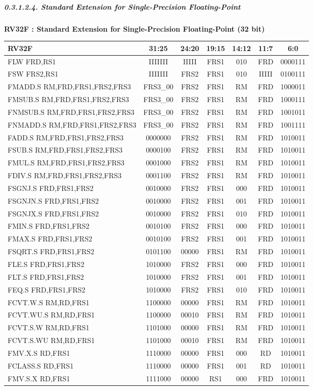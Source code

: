 \documentclass[
]{article}
\begin{document}
\hypertarget{standard-extension-for-single-precision-floating-point}{%
\subparagraph{0.3.1.2.4. Standard Extension for Single-Precision
Floating-Point}\label{standard-extension-for-single-precision-floating-point}}

\textbf{RV32F : Standard Extension for Single-Precision Floating-Point
(32 bit)}

\begin{longtable}[]{@{}lcccccc@{}}
\toprule
RV32F & 31:25 & 24:20 & 19:15 & 14:12 & 11:7 & 6:0\tabularnewline
\midrule
\endhead
FLW FRD,RS1 & IIIIIII & IIIII & FRS1 & 010 & FRD &
0000111\tabularnewline
FSW FRS2,RS1 & IIIIIII & FRS2 & FRS1 & 010 & IIIII &
0100111\tabularnewline
FMADD.S RM,FRD,FRS1,FRS2,FRS3 & FRS3\_00 & FRS2 & FRS1 & RM & FRD &
1000011\tabularnewline
FMSUB.S RM,FRD,FRS1,FRS2,FRS3 & FRS3\_00 & FRS2 & FRS1 & RM & FRD &
1000111\tabularnewline
FNMSUB.S RM,FRD,FRS1,FRS2,FRS3 & FRS3\_00 & FRS2 & FRS1 & RM & FRD &
1001011\tabularnewline
FNMADD.S RM,FRD,FRS1,FRS2,FRS3 & FRS3\_00 & FRS2 & FRS1 & RM & FRD &
1001111\tabularnewline
FADD.S RM,FRD,FRS1,FRS2,FRS3 & 0000000 & FRS2 & FRS1 & RM & FRD &
1010011\tabularnewline
FSUB.S RM,FRD,FRS1,FRS2,FRS3 & 0000100 & FRS2 & FRS1 & RM & FRD &
1010011\tabularnewline
FMUL.S RM,FRD,FRS1,FRS2,FRS3 & 0001000 & FRS2 & FRS1 & RM & FRD &
1010011\tabularnewline
FDIV.S RM,FRD,FRS1,FRS2,FRS3 & 0001100 & FRS2 & FRS1 & RM & FRD &
1010011\tabularnewline
FSGNJ.S FRD,FRS1,FRS2 & 0010000 & FRS2 & FRS1 & 000 & FRD &
1010011\tabularnewline
FSGNJN.S FRD,FRS1,FRS2 & 0010000 & FRS2 & FRS1 & 001 & FRD &
1010011\tabularnewline
FSGNJX.S FRD,FRS1,FRS2 & 0010000 & FRS2 & FRS1 & 010 & FRD &
1010011\tabularnewline
FMIN.S FRD,FRS1,FRS2 & 0010100 & FRS2 & FRS1 & 000 & FRD &
1010011\tabularnewline
FMAX.S FRD,FRS1,FRS2 & 0010100 & FRS2 & FRS1 & 001 & FRD &
1010011\tabularnewline
FSQRT.S FRD,FRS1,FRS2 & 0101100 & 00000 & FRS1 & RM & FRD &
1010011\tabularnewline
FLE.S FRD,FRS1,FRS2 & 1010000 & FRS2 & FRS1 & 000 & FRD &
1010011\tabularnewline
FLT.S FRD,FRS1,FRS2 & 1010000 & FRS2 & FRS1 & 001 & FRD &
1010011\tabularnewline
FEQ.S FRD,FRS1,FRS2 & 1010000 & FRS2 & FRS1 & 010 & FRD &
1010011\tabularnewline
FCVT.W.S RM,RD,FRS1 & 1100000 & 00000 & FRS1 & RM & FRD &
1010011\tabularnewline
FCVT.WU.S RM,RD,FRS1 & 1100000 & 00010 & FRS1 & RM & FRD &
1010011\tabularnewline
FCVT.S.W RM,RD,FRS1 & 1101000 & 00000 & FRS1 & RM & FRD &
1010011\tabularnewline
FCVT.S.WU RM,RD,FRS1 & 1101000 & 00010 & FRS1 & RM & FRD &
1010011\tabularnewline
FMV.X.S RD,FRS1 & 1110000 & 00000 & FRS1 & 000 & RD &
1010011\tabularnewline
FCLASS.S RD,FRS1 & 1110000 & 00000 & FRS1 & 001 & RD &
1010011\tabularnewline
FMV.S.X RD,FRS1 & 1111000 & 00000 & RS1 & 000 & FRD &
1010011\tabularnewline
\bottomrule
\end{longtable}
\end{document}
